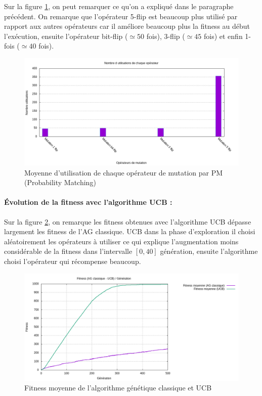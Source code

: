\documentclass[12pt]{article}
\begin{document}
Sur la figure \ref{histogrammeOppm}, on peut remarquer ce qu'on a expliqué dans le paragraphe précédent. On remarque que l'opérateur 5-flip est beaucoup plus utilisé par rapport aux autres opérateurs car il améliore beaucoup plus la fitness au début l'exécution, ensuite l'opérateur bit-flip ($\simeq 50$ fois), 3-flip ($\simeq 45$ fois) et enfin 1-fois ($\simeq 40$ fois). 

\begin{figure}[H]
	\begin{center}
		\includegraphics[scale=0.5]{img/histogrammeOppm.png}
		\caption{Moyenne d'utilisation de chaque opérateur de mutation par PM (Probability Matching)}
		\label{histogrammeOppm}
	\end{center}
\end{figure}

\paragraph{Évolution de la fitness avec l'algorithme UCB : } Sur la figure \ref{curve_ag_ucb}, on remarque les fitness obtenues avec l'algorithme UCB dépasse largement les fitness de l'AG classique. UCB dans la phase d'exploration il choisi aléatoirement les opérateurs à utiliser ce qui explique l'augmentation moins considérable de la fitness dans l'intervalle $ [0, 40] $ génération, ensuite l'algorithme choisi l'opérateur qui récompense beaucoup.

\begin{figure}[H]
	\begin{center}
		\includegraphics[scale=0.5]{img/curve_ag_ucb.png}
		\caption{Fitness moyenne de l'algorithme génétique classique et UCB}
		\label{curve_ag_ucb}
	\end{center}
\end{figure}
\end{document}

